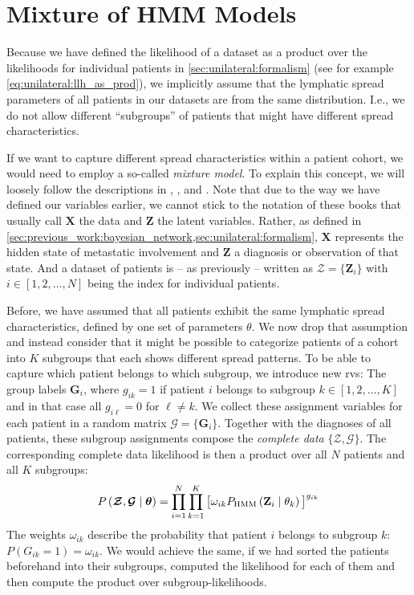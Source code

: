 \documentclass[\relativeRoot/main.tex]{subfiles}
\begin{document}
\section{Mixture of HMM Models}
\label{sec:future:mixture}

Because we have defined the likelihood of a dataset as a product over the likelihoods for individual patients in \cref{sec:unilateral:formalism} (see for example \cref{eq:unilateral:llh_as_prod}), we implicitly assume that the lymphatic spread parameters of all patients in our datasets are from the same distribution. I.e., we do not allow different ``subgroups'' of patients that might have different spread characteristics.

If we want to capture different spread characteristics within a patient cohort, we would need to employ a so-called \emph{mixture model}. To explain this concept, we will loosely follow the descriptions in , , and . Note that due to the way we have defined our variables earlier, we cannot stick to the notation of these books that usually call $\mathbf{X}$ the data and $\mathbf{Z}$ the latent variables. Rather, as defined in \cref{sec:previous_work:bayesian_network,sec:unilateral:formalism}, $\mathbf{X}$ represents the hidden state of metastatic involvement and $\mathbf{Z}$ a diagnosis or observation of that state. And a dataset of patients is -- as previously -- written as $\boldsymbol{\mathcal{Z}} = \{ \mathbf{Z}_i \}$ with $i \in [1, 2, \ldots, N]$ being the index for individual patients.

Before, we have assumed that all patients exhibit the same lymphatic spread characteristics, defined by one set of parameters $\theta$. We now drop that assumption and instead consider that it might be possible to categorize patients of a cohort into $K$ subgroups that each shows different spread patterns. To be able to capture which patient belongs to which subgroup, we introduce new \glspl{rv}: The group labels $\mathbf{G}_i$, where $g_{ik} = 1$ if patient $i$ belongs to subgroup $k \in [1,2, \ldots, K]$ and in that case all $g_{i\ell} = 0$ for $\ell \neq k$. We collect these assignment variables for each patient in a random matrix $\boldsymbol{\mathcal{G}} = \{ \mathbf{G}_i \}$. Together with the diagnoses of all patients, these subgroup assignments compose the \emph{complete data} $\{ \boldsymbol{\mathcal{Z}}, \boldsymbol{\mathcal{G}} \}$. The corresponding complete data likelihood is then a product over all $N$ patients and all $K$ subgroups:
%
\begin{equation} \label{eq:future:mixture:complete_llh}
    P \left( \boldsymbol{\mathcal{Z}}, \boldsymbol{\mathcal{G}} \mid \boldsymbol{\theta} \right) = \prod_{i=1}^N{ \prod_{k=1}^K{ \big[ \omega_{ik} P_\text{HMM} \left( \mathbf{Z}_i \mid \theta_k \right) \big]^{g_{ik}} } }
\end{equation}
%
The weights $\omega_{ik}$ describe the probability that patient $i$ belongs to subgroup $k$: $P \left( G_{ik} = 1 \right) = \omega_{ik}$. We would achieve the same, if we had sorted the patients beforehand into their subgroups, computed the likelihood for each of them and then compute the product over subgroup-likelihoods.
\end{document}
